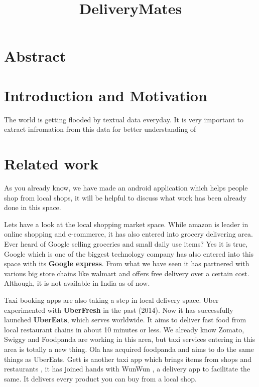 \documentclass{report}
\begin{document}
\title{\Huge  DeliveryMates\linebreak}
\date{}
\maketitle
\setlength{\columnsep}{0.7cm}
\chapter{Abstract}
\par \Large \textit { }


\chapter{Introduction and Motivation}

\par \Large The world is getting flooded by textual data everyday. It is very important to extract infromation from this data for better understanding of


\chapter{Related work}
\par As you already know,  we have made an android application which helps people shop from local shops, it will be helpful to discuss what work has been already done in this space.

\par Let\textquotesingle s have a look at the local shopping market space. While amazon is leader in online shopping and e-commerce, it has also entered into grocery delivering area. Ever heard of Google selling groceries and small daily use items? Yes it is true, Google which is one of the biggest technology company has also entered into this space with its
\textbf{Google express}. From what we have seen it has partnered  with various big store chains like walmart and offers free delivery over a certain cost. Although, it is not available in India as of now.

\par Taxi booking apps are also taking a step in local delivery space. Uber experimented with \textbf{UberFresh} in the past (2014). Now it has successfully launched \textbf{UberEats}, which serves worldwide.  It aims to deliver fast food from local restaurant chains in about 10 minutes or less. We already know Zomato, Swiggy and Foodpanda are working in this area, but taxi services entering in this area is totally a new thing. Ola has acquired foodpanda and aims to do the same things as UberEats.
Gett is another taxi app which brings items from shops and restaurants , it has joined hands with WunWun , a delivery app to facilitate the same. It delivers every product you can buy from a local shop. 
\end{document}
